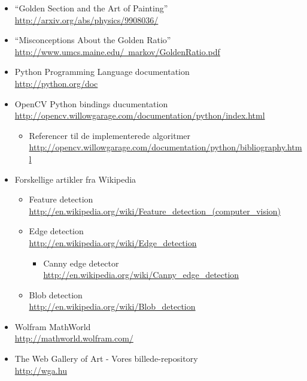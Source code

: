 \begin{itemize}
	\item ``Golden Section and the Art of Painting''\\
		\href{http://arxiv.org/abs/physics/9908036/}{http://arxiv.org/abs/physics/9908036/}
	\item ``Misconceptions About the Golden Ratio''\\
		\href{http://www.umcs.maine.edu/~markov/GoldenRatio.pdf}{http://www.umcs.maine.edu/~markov/GoldenRatio.pdf}
	\item Python Programming Language documentation\\
		\href{http://python.org/doc}{http://python.org/doc}
	\item OpenCV Python bindings ducumentation\\
		\href{http://opencv.willowgarage.com/documentation/python/index.html}{http://opencv.willowgarage.com/documentation/python/index.html}
		\begin{itemize}
			\item Referencer til de implementerede algoritmer\\
				\href{http://opencv.willowgarage.com/documentation/python/bibliography.html}{http://opencv.willowgarage.com/documentation/python/bibliography.html}
		\end{itemize}
	\item Forskellige artikler fra Wikipedia\\
		\begin{itemize}
			\item Feature detection\\
				\href{http://en.wikipedia.org/wiki/Feature\_detection\_(computer\_vision)}{http://en.wikipedia.org/wiki/Feature\_detection\_(computer\_vision)}\\
			\item Edge detection\\
				\href{http://en.wikipedia.org/wiki/Edge\_detection}{http://en.wikipedia.org/wiki/Edge\_detection}
					\begin{itemize}
						\item Canny edge detector\\
							\href{http://en.wikipedia.org/wiki/Canny\_edge\_detection}{http://en.wikipedia.org/wiki/Canny\_edge\_detection}
					\end{itemize}
			\item Blob detection\\
				\href{http://en.wikipedia.org/wiki/Blob\_detection}{http://en.wikipedia.org/wiki/Blob\_detection}
		\end{itemize}
	\item Wolfram MathWorld\\
		\href{http://mathworld.wolfram.com/}{http://mathworld.wolfram.com/}
	\item The Web Gallery of Art - Vores billede-repository\\
		\href{http://wga.hu}{http://wga.hu}
\end{itemize}
